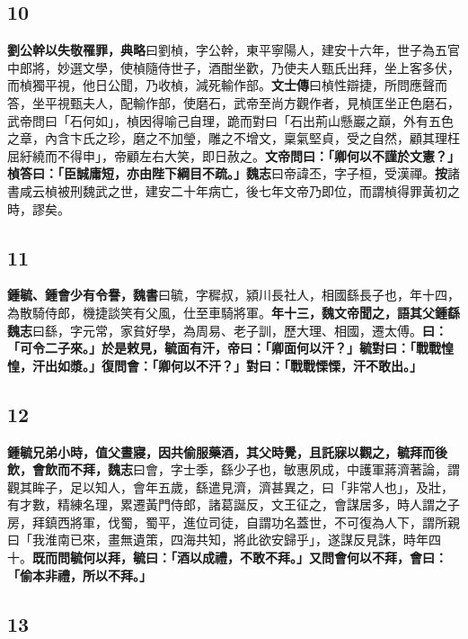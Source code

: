 \subsection*{10}

\textbf{劉公幹以失敬罹罪，}{\footnotesize \textbf{典略}曰劉楨，字公幹，東平寧陽人，建安十六年，世子為五官中郎將，妙選文學，使楨隨侍世子，酒酣坐歡，乃使夫人甄氏出拜，坐上客多伏，而楨獨平視，他日公聞，乃收楨，減死輸作部。\textbf{文士傳}曰楨性辯捷，所問應聲而答，坐平視甄夫人，配輸作部，使磨石，武帝至尚方觀作者，見楨匡坐正色磨石，武帝問曰「石何如」，楨因得喻己自理，跪而對曰「石出荊山懸巖之巔，外有五色之章，內含卞氏之珍，磨之不加瑩，雕之不增文，稟氣堅貞，受之自然，顧其理枉屈紆繞而不得申」，帝顧左右大笑，即日赦之。}\textbf{文帝問曰：「卿何以不謹於文憲？」楨答曰：「臣誠庸短，亦由陛下綱目不疏。」}{\footnotesize \textbf{魏志}曰帝諱丕，字子桓，受漢禪。\textbf{按}諸書咸云楨被刑魏武之世，建安二十年病亡，後七年文帝乃即位，而謂楨得罪黃初之時，謬矣。}

\subsection*{11}

\textbf{鍾毓、鍾會少有令譽，}{\footnotesize \textbf{魏書}曰毓，字穉叔，潁川長社人，相國繇長子也，年十四，為散騎侍郎，機捷談笑有父風，仕至車騎將軍。}\textbf{年十三，魏文帝聞之，語其父鍾繇}{\footnotesize \textbf{魏志}曰繇，字元常，家貧好學，為周易、老子訓，歷大理、相國，遷太傅。}\textbf{曰：「可令二子來。」於是敕見，毓面有汗，帝曰：「卿面何以汗？」毓對曰：「戰戰惶惶，汗出如漿。」復問會：「卿何以不汗？」對曰：「戰戰慄慄，汗不敢出。」}

\subsection*{12}

\textbf{鍾毓兄弟小時，值父晝寢，因共偷服藥酒，其父時覺，且託寐以觀之，毓拜而後飲，會飲而不拜，}{\footnotesize \textbf{魏志}曰會，字士季，繇少子也，敏惠夙成，中護軍蔣濟著論，謂觀其眸子，足以知人，會年五歲，繇遣見濟，濟甚異之，曰「非常人也」，及壯，有才數，精練名理，累遷黃門侍郎，諸葛誕反，文王征之，會謀居多，時人謂之子房，拜鎮西將軍，伐蜀，蜀平，進位司徒，自謂功名蓋世，不可復為人下，謂所親曰「我淮南已來，畫無遺策，四海共知，將此欲安歸乎」，遂謀反見誅，時年四十。}\textbf{既而問毓何以拜，毓曰：「酒以成禮，不敢不拜。」又問會何以不拜，會曰：「偷本非禮，所以不拜。」}

\subsection*{13}

